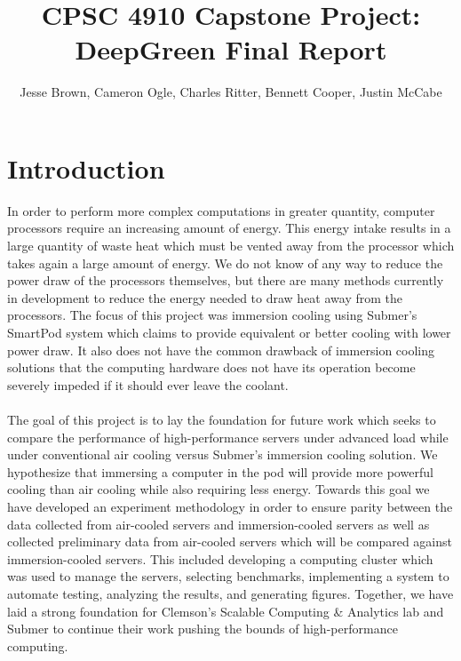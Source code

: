 \documentclass[sigconf]{acmart}
\title{CPSC 4910 Capstone Project: DeepGreen Final Report}
\author{Jesse Brown, Cameron Ogle, Charles Ritter, Bennett Cooper, Justin McCabe}
\begin{document}
\maketitle

\section{Introduction}
In order to perform more complex computations in greater quantity, computer processors require an increasing amount of energy. This energy intake results in a large quantity of waste heat which must be vented away from the processor which takes again a large amount of energy. We do not know of any way to reduce the power draw of the processors themselves, but there are many methods currently in development to reduce the energy needed to draw heat away from the processors. The focus of this project was immersion cooling using Submer's SmartPod system which claims to provide equivalent or better cooling with lower power draw. It also does not have the common drawback of immersion cooling solutions that the computing hardware does not have its operation become severely impeded if it should ever leave the coolant.
\\\\
The goal of this project is to lay the foundation for future work which seeks to compare the performance of high-performance servers under advanced load while under conventional air cooling versus Submer's immersion cooling solution. We hypothesize that immersing a computer in the pod will provide more powerful cooling than air cooling while also requiring less energy. Towards this goal we have developed an experiment methodology in order to ensure parity between the data collected from air-cooled servers and immersion-cooled servers as well as collected preliminary data from air-cooled servers which will be compared against immersion-cooled servers. This included developing a computing cluster which was used to manage the servers, selecting benchmarks, implementing a system to automate testing, analyzing the results, and generating figures. Together, we have laid a strong foundation for Clemson's Scalable Computing \& Analytics lab and Submer to continue their work pushing the bounds of high-performance computing.
\end{document}
